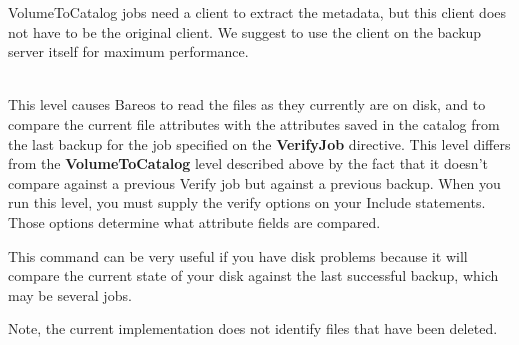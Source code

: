 {\begin{description}
\begin{description}
VolumeToCatalog jobs need a client to extract the metadata, but this
client does not have to be the original client. We suggest to use the
client on the backup server itself for maximum performance.


\item [DiskToCatalog] \hfill \\
This level causes Bareos to read the files as they currently are on
disk, and to compare the current file attributes with the attributes
saved in the catalog from the last backup for the job specified on the
{\bf VerifyJob} directive.  This level differs from the {\bf VolumeToCatalog}
level described above by the fact that it doesn't compare against a
previous Verify job but against a previous backup.  When you run this
level, you must supply the verify options on your Include statements.
Those options determine what attribute fields are compared.

This command can be very useful if you have disk problems because it
will compare the current state of your disk against the last successful
backup, which may be several jobs.

Note, the current implementation does not identify files that
have been deleted.
\end{description}

\end{description}
}




